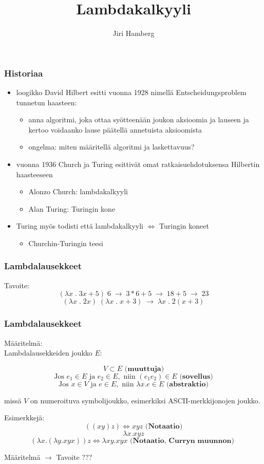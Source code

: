 \documentclass[12pt]{beamer}
\begin{document}
\title{Lambdakalkyyli}
\author{Jiri Hamberg}
\frame{\maketitle}

\begin{frame}
\frametitle{Historiaa}

\begin{itemize}
\item loogikko David Hilbert esitti vuonna 1928 nimellä Entscheidungsproblem tunnetun haasteen:
	\begin{itemize}
	\item anna algoritmi, joka ottaa syötteenään joukon aksioomia ja lauseen ja kertoo voidaanko lause päätellä annetuista aksioomista
	\item \alert{ongelma: miten määritellä algoritmi ja laskettavuus?}
\pause	
	\end{itemize}
\item vuonna 1936 Church ja Turing esittivät omat ratkaisuehdotuksensa Hilbertin haasteeseen
	\begin{itemize}
	\item Alonzo Church: lambdakalkyyli	
	\item Alan Turing: Turingin kone
	\end{itemize}
\pause
\item Turing myös todisti että lambdakalkyyli $\Leftrightarrow$ Turingin koneet  
	\begin{itemize} \item \alert{Churchin-Turingin teesi} \end{itemize} 
\end{itemize}
\end{frame}

\begin{frame}
\frametitle{Lambdalausekkeet}
Tavoite:
\[ 
(\lambda x \;. \; 3x + 5) \; 6 \; \rightarrow \; 3 * 6 + 5 \; \rightarrow \; 18 + 5 \; \rightarrow \; 23 
\]
\pause
\[ 
(\lambda x \;. \; 2x) \; (\lambda x \;. \; x + 3) \; \rightarrow \; \lambda x \; . \; 2(x + 3) 
\]
\end{frame}

\begin{frame}
\frametitle{Lambdalausekkeet}
Määritelmä: \\
Lambdalausekkeiden joukko $E$:

\[ V \subset E \textbf{  (muuttuja)}\]
\[ \text{Jos } e_{1} \in E \text{ ja } e_{2} \in E, \text{ niin }  (e_{1}e_{2}) \in E \textbf{  (sovellus)} \]
\[ \text{Jos } x \in V \text{ ja } e \in E, \text{ niin } \lambda x.e \in E \textbf{  (abstraktio)}\]

missä $V$ on numeroituva symbolijoukko, esimerkiksi ASCII-merkkijonojen joukko.

\pause
\par
Esimerkkejä:
\[ ((xy)z)  \Leftrightarrow xyz \textbf{  (Notaatio)} \]
\[ \lambda x . xyz \]
\[ (\lambda x . (\lambda y . xyx)) z \Leftrightarrow \lambda xy . xyx \textbf{  (Notaatio, Curryn muunnon) } \]
\par
\pause
\alert{Määritelmä $\rightarrow$ Tavoite ???}
\end{frame}
\end{document}
